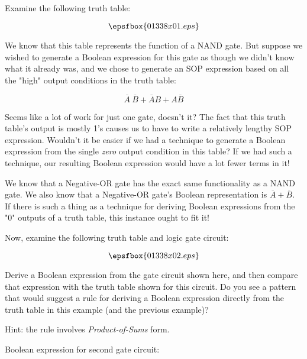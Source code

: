 

Examine the following truth table:

$$\epsfbox{01338x01.eps}$$

We know that this table represents the function of a NAND gate.  But suppose we wished to generate a Boolean expression for this gate as though we didn't know what it already was, and we chose to generate an SOP expression based on all the "high" output conditions in the truth table:

$$\overline{A} \> \overline{B} + \overline{A}B + A\overline{B}$$

Seems like a lot of work for just one gate, doesn't it?  The fact that this truth table's output is mostly 1's causes us to have to write a relatively lengthy SOP expression.  Wouldn't it be easier if we had a technique to generate a Boolean expression from the single {\it zero} output condition in this table?  If we had such a technique, our resulting Boolean expression would have a lot fewer terms in it!

We know that a Negative-OR gate has the exact same functionality as a NAND gate.  We also know that a Negative-OR gate's Boolean representation is $\overline{A} + \overline{B}$.  If there is such a thing as a technique for deriving Boolean expressions from the "0" outputs of a truth table, this instance ought to fit it!

\vskip 10pt

Now, examine the following truth table and logic gate circuit:

$$\epsfbox{01338x02.eps}$$

Derive a Boolean expression from the gate circuit shown here, and then compare that expression with the truth table shown for this circuit.  Do you see a pattern that would suggest a rule for deriving a Boolean expression directly from the truth table in this example (and the previous example)?

Hint: the rule involves {\it Product-of-Sums} form.







Boolean expression for second gate circuit:

